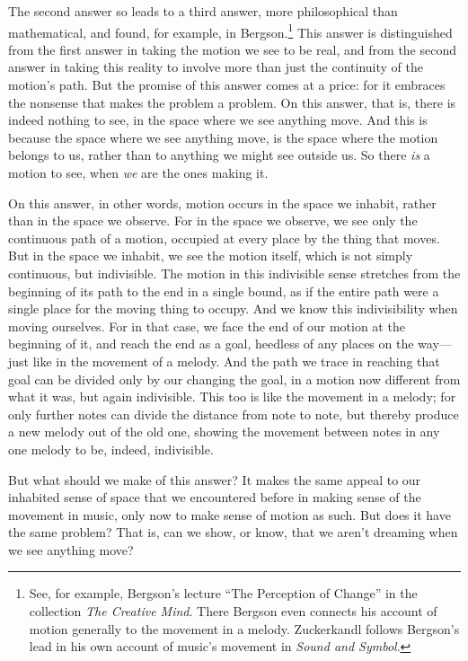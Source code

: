 \documentclass[12pt]{memoir}
\begin{document}
The second answer so leads to a third answer, more philosophical than
mathematical, and found, for example, in Bergson.\footnote{See, for
  example, Bergson's lecture ``The Perception of Change'' in the
  collection \emph{The Creative Mind}. There Bergson even connects his
  account of motion generally to the movement in a melody. Zuckerkandl
  follows Bergson's lead in his own account of music's movement in
  \emph{Sound and Symbol}.} This answer is distinguished from the first
answer in taking the motion we see to be real, and from the second
answer in taking this reality to involve more than just the continuity
of the motion's path. But the promise of this answer comes at a price:
for it embraces the nonsense that makes the problem a problem. On this
answer, that is, there is indeed nothing to see, in the space where we
see anything move. And this is because the space where we see anything
move, is the space where the motion belongs to us, rather than to
anything we might see outside us. So there \emph{is} a motion to see,
when \emph{we} are the ones making it.

On this answer, in other words, motion occurs in the space we inhabit, rather than in
the space we observe. For in the space we observe, we see only the
continuous path of a motion, occupied at every place by the thing that
moves. But in the space we inhabit, we see the motion itself, which is
not simply continuous, but indivisible. The motion in this indivisible
sense stretches from the beginning of its path to the end in a single
bound, as if the entire path were a single place for the moving thing to
occupy. And we know this indivisibility when moving ourselves. For in
that case, we face the end of our motion at the beginning of it, and
reach the end as a goal, heedless of any places on the way---just
like in the movement of a melody. And the path we trace in reaching that
goal can be divided only by our changing the goal, in a motion now
different from what it was, but again indivisible. This too is like the
movement in a melody; for only further notes can divide the distance
from note to note, but thereby produce a new melody out of the old one,
showing the movement between notes in any one melody to be, indeed,
indivisible.

But what should we make of this answer? It makes the same appeal to our
inhabited sense of space that we encountered before in making sense of
the movement in music, only now to make sense of motion as such. But
does it have the same problem? That is, can we show, or know, that we
aren't dreaming when we see anything move?
\end{document}
